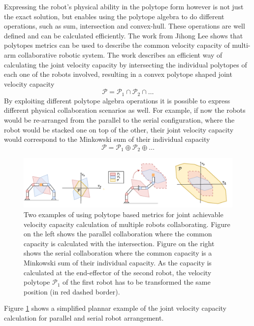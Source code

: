 Expressing the robot's physical ability in the polytope form however is not just the exact solution, but enables using the polytope algebra to do different operations, such as sum, intersection and convex-hull. These operations are well defined and can be calculated efficiently. The work from Jihong Lee \cite{lee2001velocity} shows that polytopes metrics can be used to describe the common velocity capacity of multi-arm collaborative robotic system.  The work describes an efficient way of calculating the joint velocity capacity by intersecting the individual polytopes of each one of the robots involved, resulting in a convex polytope shaped joint velocity capacity $$\mathcal{P}=\mathcal{P}_1 \cap \mathcal{P}_2  \cap \ldots$$
By exploiting different polytope algebra operations it is possible to express different physical collaboration scenarios as well. For example, if now the robots would be re-arranged from the parallel to the serial configuration, where the robot would be stacked one on top of the other, their joint velocity capacity would correspond to the Minkowski sum of their individual capacity $$\mathcal{P}=\mathcal{P}_1 \oplus \mathcal{P}_2  \oplus \ldots$$

\begin{figure}[!h]
    \centering
    \includegraphics[width=\linewidth]{Chapters/imgs/collab_serial_parallel.pdf}
    \caption{Two examples of using polytope based metrics for joint achievable velocity capacity calculation of multiple robots collaborating. Figure on the left shows the parallel collaboration where the common capacity is calculated with the intersection. Figure on the right shows the serial collaboration where the common capacity is a Minkowski sum of their individual capacity. As the capacity is calculated at the end-effector of the second robot, the velocity polytope $\mathcal{P}_1$ of the first robot has to be transformed the same position (in red dashed border).}
    \label{fig:collab_serial_parallel}
\end{figure}
Figure \ref{fig:collab_serial_parallel} shows a simplified plannar example of the joint velocity capacity calculation for parallel and serial robot arrangement.


